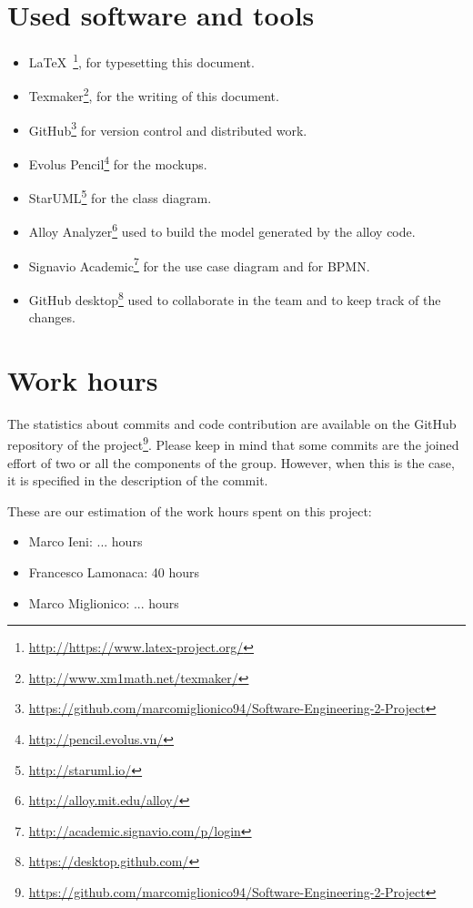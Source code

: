 \section{Used software and tools}
\begin{itemize}
    \item \LaTeX\ \footnote{\url{http://https://www.latex-project.org/}}, for typesetting this document.
    \item Texmaker\footnote{\url{http://www.xm1math.net/texmaker/}}, for the writing of this document.
    \item GitHub\footnote{\url{https://github.com/marcomiglionico94/Software-Engineering-2-Project}} for version control and distributed work.
    \item Evolus Pencil\footnote{\url{http://pencil.evolus.vn/}} for the mockups.
    \item StarUML\footnote{\url{http://staruml.io/}} for the class diagram.
    \item Alloy Analyzer\footnote{\url{http://alloy.mit.edu/alloy/}} used to build the model generated by the alloy code.
    \item Signavio Academic\footnote{\url{http://academic.signavio.com/p/login}} for the use case diagram and for BPMN.
    \item GitHub desktop\footnote{\url{https://desktop.github.com/}} used to collaborate in the team and to keep track of the changes. 
\end{itemize}

\section{Work hours}
The statistics about commits and code contribution are available on the GitHub repository of the project\footnote{\url{https://github.com/marcomiglionico94/Software-Engineering-2-Project}}.
Please keep in mind that some commits are the joined effort of two or all the components of the group. However, when this is the case, it is specified in the description of the commit.

These are our estimation of the work hours spent on this project:
\begin{itemize}
    \item Marco Ieni: ... hours
    \item Francesco Lamonaca: 40 hours
    \item Marco Miglionico: ... hours
\end{itemize}
